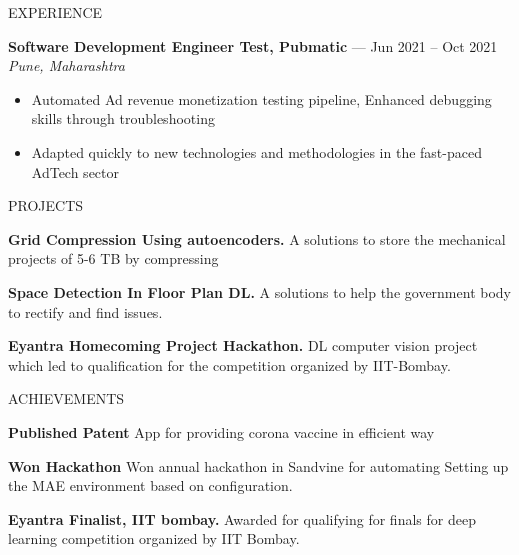 \documentclass{resume} %
\begin{document}
\begin{rSection}{EXPERIENCE}
\begin{itemize}
 \end{itemize}
 
\textbf{Software Development Engineer Test, Pubmatic} --- Jun 2021 -- Oct 2021\\
\textit{Pune, Maharashtra}\\
 \begin{itemize}
    \itemsep -6pt 
     \item Automated Ad revenue monetization testing pipeline, Enhanced debugging skills through troubleshooting
    \item Adapted quickly to new technologies and methodologies in the fast-paced AdTech sector
 \end{itemize}
\end{rSection} 


\begin{rSection}{PROJECTS}

\itemsep -6pt 
\item \textbf{Grid Compression Using autoencoders.} {A solutions to store the mechanical projects of 5-6 TB by compressing}
\item \textbf{Space Detection In Floor Plan DL.} {A solutions to help the government body to rectify and find issues.}
\item \textbf{Eyantra Homecoming Project Hackathon.} {DL computer vision project which led to qualification for the competition organized by IIT-Bombay.}
\end{rSection} 



\begin{rSection}{ACHIEVEMENTS}

\itemsep -6pt 
\item \textbf{Published Patent} {App for providing corona vaccine in efficient way}
\item \textbf{Won Hackathon} {Won annual hackathon in Sandvine for automating Setting up the MAE environment based on configuration.}
\item \textbf{Eyantra Finalist, IIT bombay.} {Awarded for qualifying for finals for deep learning competition organized by IIT Bombay.}
\end{rSection} 
\end{document}
